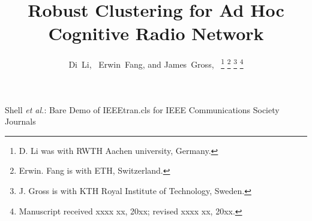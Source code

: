 \documentclass[10pt,journal,compsoc]{IEEEtran}
\theoremstyle{mytheoremstyle}
\theoremstyle{mytheoremstyle}
\theoremstyle{mytheoremstyle}
\begin{document}
%
\title{Robust Clustering for Ad Hoc Cognitive Radio Network}
%
%
%

\author{Di~Li,~
        Erwin~Fang,
        and James~Gross,~%
\thanks{D. Li was with RWTH Aachen university, Germany.}%
\thanks{Erwin. Fang is with ETH, Switzerland.}%
\thanks{J. Gross is with KTH Royal Institute of Technology, Sweden.}%
\thanks{Manuscript received xxxx xx, 20xx; revised xxxx xx, 20xx.}}

% 
%



%
{Shell \MakeLowercase{\textit{et al.}}: Bare Demo of IEEEtran.cls for IEEE Communications Society Journals}
% 
\end{document}
